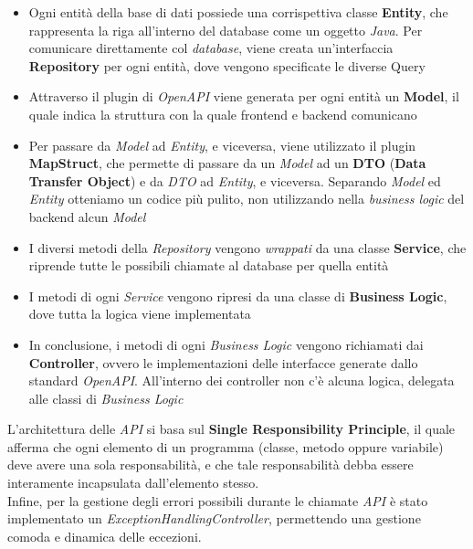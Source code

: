 \documentclass{article}
\begin{document}
\begin{itemize}[label = {-}]
    \itemsep0em
    \item Ogni entità della base di dati possiede una corrispettiva classe \textbf{Entity}, che rappresenta la riga all'interno del database come un oggetto \textit{Java}. Per comunicare direttamente col \textit{database}, viene creata un'interfaccia \textbf{Repository} per ogni entità, dove vengono specificate le diverse Query
    \item Attraverso il plugin di \textit{OpenAPI} viene generata per ogni entità un \textbf{Model}, il quale indica la struttura con la quale frontend e backend comunicano
    \item Per passare da \textit{Model} ad \textit{Entity}, e viceversa, viene utilizzato il plugin \textbf{MapStruct}, che permette di passare da un \textit{Model} ad un \textbf{DTO} (\textbf{Data Transfer Object}) e da \textit{DTO} ad \textit{Entity}, e viceversa. Separando \textit{Model} ed \textit{Entity} otteniamo un codice più pulito, non utilizzando nella \textit{business logic} del backend alcun \textit{Model}
    \item I diversi metodi della \textit{Repository} vengono \textit{wrappati} da una classe \textbf{Service}, che riprende tutte le possibili chiamate al database per quella entità
    \item I metodi di ogni \textit{Service} vengono ripresi da una classe di \textbf{Business Logic}, dove tutta la logica viene implementata
    \item In conclusione, i metodi di ogni \textit{Business Logic} vengono richiamati dai \textbf{Controller}, ovvero le implementazioni delle interfacce generate dallo standard \textit{OpenAPI}. All'interno dei controller non c'è alcuna logica, delegata alle classi di \textit{Business Logic}
\end{itemize}
L'architettura delle \textit{API} si basa sul \textbf{Single Responsibility Principle}, il quale afferma che ogni elemento di un programma (classe, metodo oppure variabile) deve avere una sola responsabilità, e che tale responsabilità debba essere interamente incapsulata dall'elemento stesso.\vspace*{7pt}\\
Infine, per la gestione degli errori possibili durante le chiamate \textit{API} è stato implementato un \textit{ExceptionHandlingController}, permettendo una gestione comoda e dinamica delle eccezioni.\vspace*{7pt}\\
\end{document}
